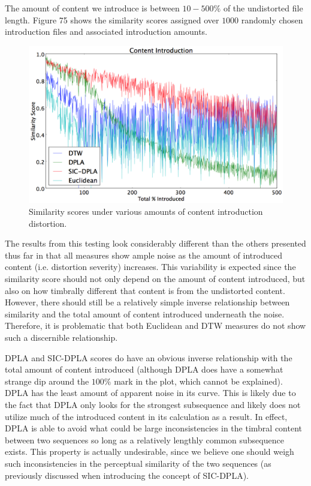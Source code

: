 \documentclass[12pt]{report} 	%
\numberwithin{figure}{chapter}
\numberwithin{table}{chapter}
\numberwithin{equation}{chapter}
\begin{document}
\begin{flushleft}
The amount of content we introduce is between $10-500\%$ of the undistorted file length. Figure 75 shows the similarity scores assigned over $1000$ randomly chosen introduction files and associated introduction amounts.
\begin{figure}[h!]
\vspace{18pt}
\begin{center}
\includegraphics[scale=0.5,width=\linewidth]{ContentIntroduction}
\caption[Content introduction results]{Similarity scores under various amounts of content introduction distortion.}
\end{center}
\end{figure}
The results from this testing look considerably different than the others presented thus far in that all measures show ample noise as the amount of introduced content (i.e. distortion severity) increases. This variability is expected since the similarity score should not only depend on the amount of content introduced, but also on how timbrally different that content is from the undistorted content. However, there should still be a relatively simple inverse relationship between similarity and the total amount of content introduced underneath the noise. Therefore, it is problematic that both Euclidean and DTW measures do not show such a discernible relationship.

DPLA and SIC-DPLA scores do have an obvious inverse relationship with the total amount of content introduced (although DPLA does have a somewhat strange dip around the $100\%$ mark in the plot, which cannot be explained). DPLA has the least amount of apparent noise in its curve. This is likely due to the fact that DPLA only looks for the strongest subsequence and likely does not utilize much of the introduced content in its calculation as a result. In effect, DPLA is able to avoid what could be large inconsistencies in the timbral content between two sequences so long as a relatively lengthly common subsequence exists. This property is actually undesirable, since we believe one should weigh such inconsistencies in the perceptual similarity of the two sequences (as previously discussed when introducing the concept of SIC-DPLA).


\end{flushleft}
\end{document}
